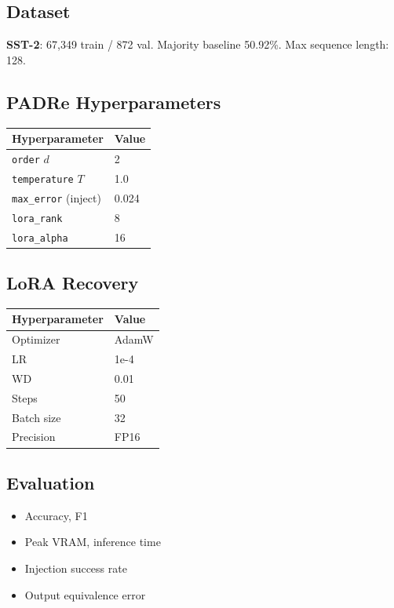 \subsection{Dataset}

\textbf{SST-2}: 67,349 train / 872 val. Majority baseline 50.92\%. 
Max sequence length: 128.

\subsection{PADRe Hyperparameters}

\begin{table}[H]
\centering
\small
\begin{tabular}{ll}
\toprule
\textbf{Hyperparameter} & \textbf{Value} \\
\midrule
\texttt{order} $d$ & 2 \\
\texttt{temperature} $T$ & 1.0 \\
\texttt{max\_error} (inject) & 0.024 \\
\texttt{lora\_rank} & 8 \\
\texttt{lora\_alpha} & 16 \\
\bottomrule
\end{tabular}
\end{table}

\subsection{LoRA Recovery}

\begin{table}[H]
\centering
\small
\begin{tabular}{ll}
\toprule
\textbf{Hyperparameter} & \textbf{Value} \\
\midrule
Optimizer & AdamW \\
LR & 1e-4 \\
WD & 0.01 \\
Steps & 50 \\
Batch size & 32 \\
Precision & FP16 \\
\bottomrule
\end{tabular}
\end{table}

\subsection{Evaluation}

\begin{itemize}
\item Accuracy, F1
\item Peak VRAM, inference time
\item Injection success rate
\item Output equivalence error

\end{itemize}
